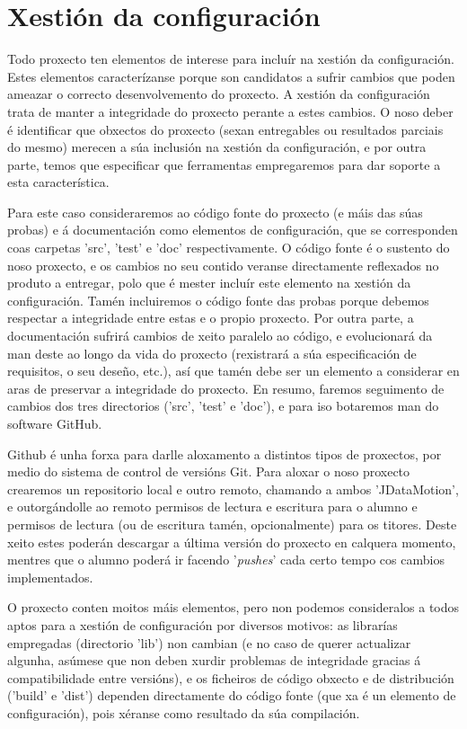 \section{Xestión da configuración}

Todo proxecto ten elementos de interese para incluír na xestión da configuración. Estes elementos caracterízanse porque son candidatos a sufrir cambios que poden ameazar o correcto desenvolvemento do proxecto. A xestión da configuración trata de manter a integridade do proxecto perante a estes cambios. O noso deber é identificar que obxectos do proxecto (sexan entregables ou resultados parciais do mesmo) merecen a súa inclusión na xestión da configuración, e por outra parte, temos que especificar que ferramentas empregaremos para dar soporte a esta característica.

Para este caso consideraremos ao código fonte do proxecto (e máis das súas probas) e á documentación como elementos de configuración, que se corresponden coas carpetas 'src', 'test' e 'doc' respectivamente. O código fonte é o sustento do noso proxecto, e os cambios no seu contido veranse directamente reflexados no produto a entregar, polo que é mester incluír este elemento na xestión da configuración. Tamén incluiremos o código fonte das probas porque debemos respectar a integridade entre estas e o propio proxecto. Por outra parte, a documentación sufrirá cambios de xeito paralelo ao código, e evolucionará da man deste ao longo da vida do proxecto (rexistrará a súa especificación de requisitos, o seu deseño, etc.), así que tamén debe ser un elemento a considerar en aras de preservar a integridade do proxecto. En resumo, faremos seguimento de cambios dos tres directorios ('src', 'test' e 'doc'), e para iso botaremos man do software GitHub\cite{github}.

Github é unha forxa para darlle aloxamento a distintos tipos de proxectos, por medio do sistema de control de versións Git. Para aloxar o noso proxecto crearemos un repositorio local e outro remoto, chamando a ambos 'JDataMotion', e outorgándolle ao remoto permisos de lectura e escritura para o alumno e permisos de lectura (ou de escritura tamén, opcionalmente) para os titores. Deste xeito estes poderán descargar a última versión do proxecto en calquera momento, mentres que o alumno poderá ir facendo '{\it pushes}' cada certo tempo cos cambios implementados.

O proxecto conten moitos máis elementos, pero non podemos consideralos a todos aptos para a xestión de configuración por diversos motivos: as librarías empregadas (directorio 'lib') non cambian (e no caso de querer actualizar algunha, asúmese que non deben xurdir problemas de integridade gracias á compatibilidade entre versións), e os ficheiros de código obxecto e de distribución ('build' e 'dist') dependen directamente do código fonte (que xa é un elemento de configuración), pois xéranse como resultado da súa compilación.

